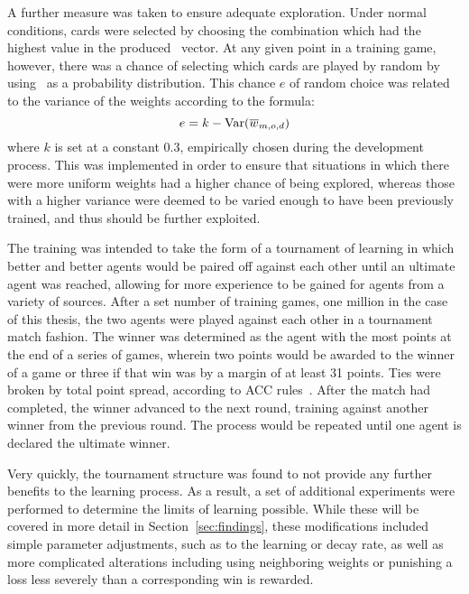\newcommand{\Var}{\mathrm{Var}}
A further measure was taken to ensure adequate exploration.
%
Under normal conditions,
cards were selected by choosing the combination which had the highest value in
the produced \pvec\ vector.
%
At any given point in a training game, however,
there was a chance of selecting which cards are played
by random by using \pvec\ as a probability distribution.
%
This chance $e$ of random choice was related to the variance of the 
weights according to the formula:
\[
	e = k - \Var(\wvecm_{m,o,d})
\]
where $k$ is set at a constant $0.3$, empirically chosen during the
development process.
%
This was implemented in order to ensure that situations in which there were
more uniform weights had a higher chance of being explored,
whereas those with a higher variance were deemed to be varied enough to
have been previously trained,
and thus should be further exploited.

The training was intended to take the form of a tournament of learning in which
better and better agents would be paired off against each other until an
ultimate agent was reached,
allowing for more experience to be gained for agents from a variety of sources.
%
After a set number of training games,
one million in the case of this thesis, 
the two agents were played against each other in a tournament match fashion.
%
The winner was determined as the agent with the most points at the end
of a series of games, %
wherein two points would be awarded to the winner of a game
or three if that win was by a margin of at least 31 points.
%
Ties were broken by total point spread,
according to ACC rules~\cite{ACC_rules}.
%
After the match had completed,
the winner advanced to the next round,
training against another winner from the previous round.
%
The process would be
repeated until one agent is declared the ultimate winner.

Very quickly,
the tournament structure was found to not provide any further benefits
to the learning process.
%
As a result,
a set of additional experiments were performed to determine the limits of
learning possible.
%
While these will be covered in more detail in Section~\ref{sec:findings},
these modifications included simple
parameter adjustments, such as to the learning or decay rate,
as well as
more complicated alterations 
including using neighboring weights
or punishing a loss less severely than a corresponding win is rewarded.


